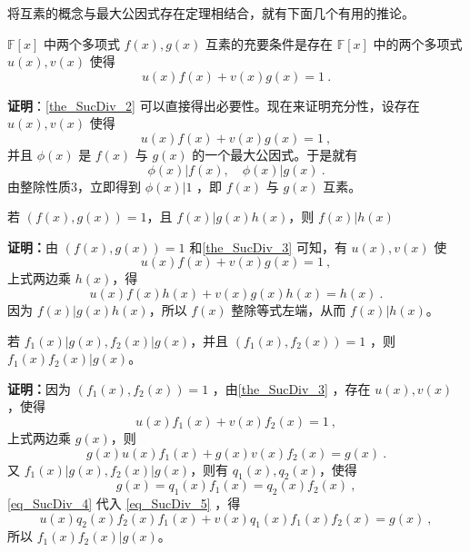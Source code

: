 将互素的概念与最大公因式存在定理相结合，就有下面几个有用的推论。
\begin{theorem}{}\label{the_SucDiv_3}
$\mathbb{F}[x]$ 中两个多项式 $f(x),g(x)$ 互素的充要条件是存在 $\mathbb{F}[x]$ 中的两个多项式 $u(x),v(x)$ 使得
\begin{equation}
u(x)f(x)+v(x)g(x)=1~.
\end{equation}
\end{theorem}
\textbf{证明}：\autoref{the_SucDiv_2} 可以直接得出必要性。现在来证明充分性，设存在 $u(x),v(x)$ 使得 
\begin{equation}
u(x)f(x)+v(x)g(x)=1~,
\end{equation}
并且 $\phi(x)$ 是 $f(x)$ 与 $g(x)$ 的一个最大公因式。于是就有
\begin{equation}
\phi(x)|f(x),\quad \phi(x)|g(x)~.
\end{equation}
由整除性质3，立即得到 $\phi(x)|1$ ，即 $f(x)$ 与 $g(x)$ 互素。
\begin{theorem}{}\label{the_SucDiv_4}
若 $(f(x),g(x))=1$，且 $f(x)|g(x)h(x)$，则 $f(x)|h(x)$
\end{theorem}
\textbf{证明：}由 $(f(x),g(x))=1$ 和\autoref{the_SucDiv_3} 可知，有 $u(x),v(x)$ 使
\begin{equation}
u(x)f(x)+v(x)g(x)=1~,
\end{equation}
上式两边乘 $h(x)$，得
\begin{equation}
u(x)f(x)h(x)+v(x)g(x)h(x)=h(x)~.
\end{equation}
因为 $f(x)|g(x)h(x)$，所以 $f(x)$ 整除等式左端，从而 $f(x)|h(x)$。
\begin{theorem}{}
若 $f_1(x)|g(x),f_2(x)|g(x)$，并且 $(f_1(x),f_2(x))=1$ ，则 $f_1(x)f_2(x)|g(x)$。
\end{theorem}
\textbf{证明：}因为 $(f_1(x),f_2(x))=1$ ，由\autoref{the_SucDiv_3} ，存在 $u(x),v(x)$ ，使得
\begin{equation}
u(x)f_1(x)+v(x)f_2(x)=1~,
\end{equation}
上式两边乘 $g(x)$，则
\begin{equation}\label{eq_SucDiv_5}
g(x)u(x)f_1(x)+g(x)v(x)f_2(x)=g(x)~.
\end{equation}
又 $f_1(x)|g(x),f_2(x)|g(x)$，则有 $q_1(x),q_2(x)$，使得
\begin{equation}\label{eq_SucDiv_4}
g(x)=q_1(x)f_1(x)=q_2(x)f_2(x)~,
\end{equation}
\autoref{eq_SucDiv_4} 代入 \autoref{eq_SucDiv_5} ，得
\begin{equation}
u(x)q_2(x)f_2(x)f_1(x)+v(x)q_1(x)f_1(x)f_2(x)=g(x)~,
\end{equation}
所以 $f_1(x)f_2(x)|g(x)$。